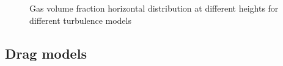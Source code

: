 \documentclass[11pt,a4paper]{article}
\begin{document}
\begin{figure}[H]
    \centering
    \caption[]{Gas volume fraction horizontal distribution at different heights for different turbulence models}
    \label{fig:alpha_turbmodel}
\end{figure}

\subsection{Drag models}
\label{sub:drag_models}
\end{document}

